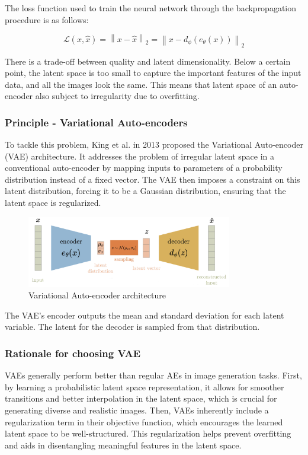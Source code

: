 \documentclass{article}
\begin{document}
The loss function used to train the neural network through the backpropagation procedure is as follows: 

\[\mathcal{L}(x,\hat{x})=\left\| x-\hat{x}\right\|_{2}=\left\| x-d_{\phi}(e_{\theta}(x)) \right\|_{2}\]

There is a trade-off between quality and latent dimensionality. Below a certain point, the latent space is too small to capture the important features of the input data, and all the images look the same.
This means that latent space of an auto-encoder also subject to irregularity due to overfitting. 

\subsubsection*{Principle - Variational Auto-encoders}
To tackle this problem, King et al. in 2013 \cite{kingma2013vae} proposed the Variational Auto-encoder (VAE) architecture. It addresses the problem of irregular latent space in a conventional auto-encoder by mapping inputs to parameters of a probability distribution instead of a fixed vector.
The VAE then imposes a constraint on this latent distribution, forcing it to be a Gaussian distribution, ensuring that the latent space is regularized.

\begin{figure}[H]
    \centering
    \includegraphics[width=0.8\textwidth]{images/vae.png}
    \caption{Variational Auto-encoder architecture}
\end{figure}

The VAE's encoder outputs the mean and standard deviation for each latent variable. The latent for the decoder is sampled from that distribution.

\subsubsection*{Rationale for choosing VAE}
VAEs generally perform better than regular AEs in image generation tasks. 
First, by learning a probabilistic latent space representation, it allows for smoother transitions and better interpolation in the latent space, which is crucial for generating diverse and realistic images. 
Then, VAEs inherently include a regularization term in their objective function, which encourages the learned latent space to be well-structured. 
This regularization helps prevent overfitting and aids in disentangling meaningful features in the latent space.
  
\end{document}
